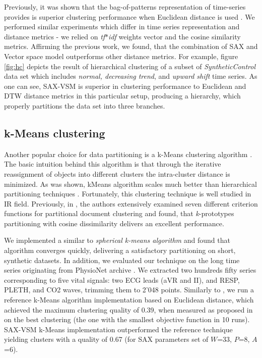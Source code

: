 \documentclass{llncs}
\begin{document}
Previously, it was shown that the bag-of-patterns representation of time-series
provides is superior clustering performance when Euclidean distance is used \cite{bag_patterns}. 
We performed similar experiments which differ in time series representation and distance
metrics - we relied on \textit{tf$\ast$idf} weights vector and the cosine similarity metrics. 
Affirming the previous work, we found, that the combination of SAX and Vector space model
outperforms other distance metrics. For example, figure \ref{fig:hc} depicts the result 
of hierarchical clustering of a subset of \textit{SyntheticControl} data set which
includes \textit{normal, decreasing trend}, and \textit{upward shift} time series.
As one can see, SAX-VSM is superior in clustering performance to Euclidean and DTW distance 
metrics in this particular setup, producing a hierarchy, which properly partitions the data set 
into three branches.

\subsection{k-Means clustering} \label{trajectory}
Another popular choice for data partitioning is a k-Means clustering algorithm \cite{kmeans}.
The basic intuition behind this algorithm is that through the iterative reassignment of objects 
into different clusters the intra-cluster distance is minimized. As was shown, kMeans 
algorithm scales much better than hierarchical partitioning techniques \cite{kscale}.
Fortunately, this clustering technique is well studied in IR field. Previously, in \cite{zhao}, the
authors extensively examined seven different criterion functions for partitional document
clustering and found, that \textit{k}-prototypes partitioning with cosine dissimilarity delivers an
excellent performance. 

We implemented a similar to \cite{modha} \textit{spherical k-means algorithm} and found that
algorithm converges quickly, delivering a satisfactory partitioning on short, synthetic datasets. 
In addition, we evaluated our technique on the long time series originating from PhysioNet 
archive \cite{physionet}. 
We extracted two hundreds fifty series corresponding to five vital signals: two ECG leads 
(aVR and II), and RESP, PLETH, and CO2 waves, trimming them to 2'048 points. Similarly to
\cite{bag_patterns}, we run a reference k-Means algorithm implementation based on Euclidean
distance, which achieved the maximum clustering quality of 0.39, when measured as proposed in
\cite{kmetrics} on the best clustering (the one with the smallest objective function in 10 runs). 
SAX-VSM k-Means implementation outperformed the reference technique yielding clusters 
with a quality of 0.67 (for SAX parameters set of $W$=33, $P$=8, $A$=6).
\end{document}
